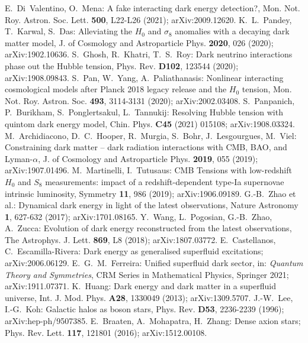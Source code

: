 \documentclass{article}
\begin{document}
\begin{thebibliography}{99}
E.~Di~Valentino, O.~Mena: A fake interacting dark energy detection?, Mon. Not. Roy. Astron. Soc. Lett. \textbf{500}, L22-L26 (2021); arXiv:2009.12620.
K.~L.~Pandey, T.~Karwal, S.~Das: Alleviating the $H_0$ and $\sigma_8$ anomalies with a decaying dark matter model, J. of Cosmology and Astroparticle Phys. \textbf{2020}, 026 (2020); arXiv:1902.10636.
S.~Ghosh, R.~Khatri, T.~S.~Roy: Dark neutrino interactions phase out the Hubble tension, Phys. Rev. \textbf{D102}, 123544 (2020); arXiv:1908.09843.
S.~Pan, W.~Yang, A.~Paliathanasis: Nonlinear interacting cosmological models after Planck 2018 legacy release and the $H_0$ tension, Mon. Not. Roy. Astron. Soc. \textbf{493}, 3114-3131 (2020); arXiv:2002.03408.
S.~Panpanich, P.~Burikham, S.~Ponglertsakul, L.~Tannukij: Resolving Hubble tension with quintom dark energy model, Chin. Phys. \textbf{C45} (2021) 015108; arXiv:1908.03324.
M.~Archidiacono, D.~C.~Hooper, R.~Murgia, S.~Bohr, J.~Lesgourgues, M.~Viel: Constraining dark matter -- dark radiation interactions with CMB, BAO, and Lyman-$\alpha$, J. of Cosmology and Astroparticle Phys. \textbf{2019}, 055 (2019); arXiv:1907.01496.
M.~Martinelli, I.~Tutusaus: CMB Tensions with low-redshift $H_0$ and $S_8$ measurements: impact of a redshift-dependent type-Ia supernovae intrinsic luminosity, Symmetry \textbf{11}, 986 (2019); arXiv:1906.09189. %
G.-B.~Zhao et al.: Dynamical dark energy in light of the latest observations, Nature Astronomy \textbf{1}, 627-632 (2017); arXiv:1701.08165.
Y.~Wang, L.~Pogosian, G.-B.~Zhao, A.~Zucca: Evolution of dark energy reconstructed from the latest observations, The Astrophys. J. Lett. \textbf{869}, L8 (2018); arXiv:1807.03772.
E.~Castellanos, C.~Escamilla-Rivera: Dark energy as generalised superfluid excitations; arXiv:2006.06129.
E.~G.~M.~Ferreira: Unified superfluid dark sector, in: \emph{Quantum Theory and Symmetries}, CRM Series in Mathematical Physics, Springer 2021; arXiv:1911.07371. %
K.~Huang: Dark energy and dark matter in a superfluid universe, Int. J. Mod. Phys. \textbf{A28}, 1330049 (2013); arXiv:1309.5707.
J.-W.~Lee, I.-G.~Koh: Galactic halos as boson stars, Phys. Rev. \textbf{D53}, 2236-2239 (1996); arXiv:hep-ph/9507385.
E.~Braaten, A.~Mohapatra, H.~Zhang: Dense axion stars; Phys. Rev. Lett. \textbf{117}, 121801 (2016); arXiv:1512.00108.

\end{thebibliography}
\end{document}
